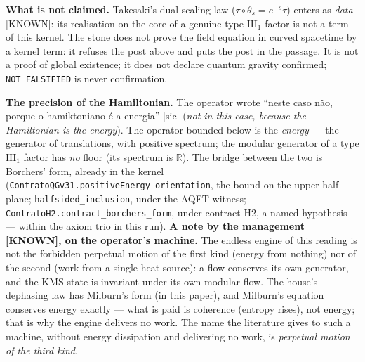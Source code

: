 \documentclass[11pt]{article}
\theoremstyle{definition}\newtheorem{deriv}{Derivation}
\begin{document}
\textbf{What is not claimed.} Takesaki's dual scaling law ($\tau\circ\theta_s=e^{-s}\tau$) enters as \emph{data} \textsf{[KNOWN]}: its realisation on the core of a genuine type $\mathrm{III}_1$ factor is not a term of this kernel. The stone does not prove the field equation in curved spacetime by a kernel term: it refuses the post above and puts the post in the passage. It is not a proof of global existence; it does not declare quantum gravity confirmed; \texttt{NOT\_FALSIFIED} is never confirmation.

\textbf{The precision of the Hamiltonian.} The operator wrote ``neste caso não, porque o hamiktoniano é a energia'' [sic] (\emph{not in this case, because the Hamiltonian is the energy}). The operator bounded below is the \emph{energy} --- the generator of translations, with positive spectrum; the modular generator of a type $\mathrm{III}_1$ factor has \emph{no} floor (its spectrum is $\mathbb{R}$). The bridge between the two is Borchers' form, already in the kernel (\texttt{ContratoQGv31.positiveEnergy\_orientation}, the bound on the upper half-plane; \texttt{halfsided\_inclusion}, under the AQFT witness; \texttt{ContratoH2.contract\_borchers\_form}, under contract H2, a named hypothesis --- within the axiom trio in this run). \textbf{A note by the management \textsf{[KNOWN]}, on the operator's machine.} The endless engine of this reading is not the forbidden perpetual motion of the first kind (energy from nothing) nor of the second (work from a single heat source): a flow conserves its own generator, and the KMS state is invariant under its own modular flow. The house's dephasing law has Milburn's form (in this paper), and Milburn's equation conserves energy exactly --- what is paid is coherence (entropy rises), not energy; that is why the engine delivers no work. The name the literature gives to such a machine, without energy dissipation and delivering no work, is \emph{perpetual motion of the third kind}.
\end{document}
